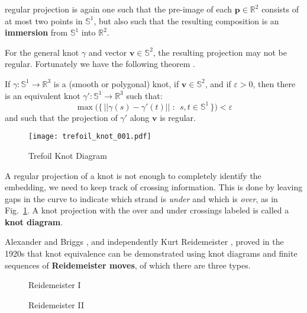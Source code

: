     regular projection is again one such that the pre-image of each
    $\mathbf{p}\in\mathbb{R}^{2}$ consists of at most two points in
    $\mathbb{S}^{1}$, but also such that the resulting composition is an
    \textbf{immersion} from $\mathbb{S}^{1}$ into $\mathbb{R}^{2}$.
    \par\hfill\par
    For the general knot $\gamma$ and vector $\mathbf{v}\in\mathbb{S}^{2}$, the
    resulting projection may not be regular. Fortunately we have the following
    theorem \cite[p.~22]{LivingstonKnotTheory}.
    \begin{theorem}
        If $\gamma:\mathbb{S}^{1}\rightarrow\mathbb{R}^{3}$ is a
        (smooth or polygonal) knot, if $\mathbf{v}\in\mathbb{S}^{2}$, and if
        $\varepsilon>0$, then there is an equivalent knot
        $\gamma':\mathbb{S}^{1}\rightarrow\mathbb{R}^{3}$ such that:
        \begin{equation}
            \max\big(
                \{\,||\gamma(s)-\gamma'(t)||\;:\;\,s,t\in\mathbb{S}^{1}\,\}
            \big)<\varepsilon
        \end{equation}
        and such that the projection of $\gamma'$ along $\mathbf{v}$ is regular.
    \end{theorem}
    \begin{figure}
        \centering
        \texttt{[image: trefoil\_knot\_001.pdf]}
        \caption{Trefoil Knot Diagram}
        \label{fig:trefoil_knot_001}
    \end{figure}
    A regular projection of a knot is not enough to completely identify the
    embedding, we need to keep track of crossing information. This is done by
    leaving gaps in the curve to indicate which strand is \textit{under} and
    which is \textit{over}, as in Fig.~\ref{fig:trefoil_knot_001}. A
    knot projection with the over and under crossings labeled is called a
    \textbf{knot diagram}.
    \par\hfill\par
    Alexander and Briggs \cite{AlexanderBriggs1926}, and independently
    Kurt Reidemeister \cite{Reidemeister1927}, proved in the 1920s that
    knot equivalence can be demonstrated using knot diagrams and finite
    sequences of \textbf{Reidemeister moves}, of which there are three types.
    \par\hfill\par
    \begin{figure}
        \centering
        \begin{minipage}[b]{0.4\textwidth}
            \centering
            \caption{Reidemeister I}
            \label{fig:reidemeister_1_move}
        \end{minipage}
        \hfill
        \begin{minipage}[b]{0.5\textwidth}
            \centering
            \caption{Reidemeister II}
            \label{fig:reidemeister_2_move}
        \end{minipage}
    \end{figure}
